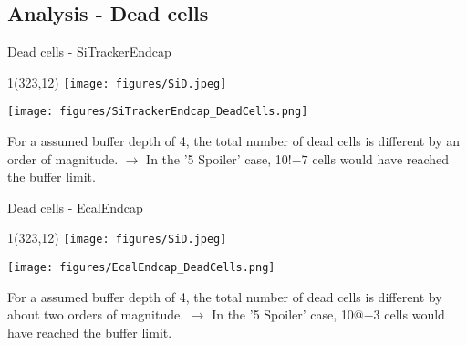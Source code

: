 \documentclass[xcolor={dvipsnames}]{beamer}
\newcommand{\sidlogo}{
  \setlength{\TPHorizModule}{1pt}
  \setlength{\TPVertModule}{1pt}
  \begin{textblock}{1}(323,12)
   \texttt{[image: figures/SiD.jpeg]}
  \end{textblock}
  }
\begin{document}
\subsection{Analysis - Dead cells}
\begin{frame}{Dead cells - \small SiTrackerEndcap}
\sidlogo
 \begin{center}
\texttt{[image: figures/SiTrackerEndcap\_DeadCells.png]}
\end{center}
\small For a assumed buffer depth of 4, the total number of dead cells is different by an order of magnitude. $\rightarrow$ In the '5 Spoiler' case, 10$!{-7}$ cells would have reached the buffer limit.
\end{frame}
\begin{frame}{Dead cells - \small EcalEndcap}
\sidlogo
 \begin{center}
\texttt{[image: figures/EcalEndcap\_DeadCells.png]}
\end{center}
\small For a assumed buffer depth of 4, the total number of dead cells is different by about two orders of magnitude. $\rightarrow$ In the '5 Spoiler' case, 10$@{-3}$ cells would have reached the buffer limit.
\end{frame}
\end{document}
